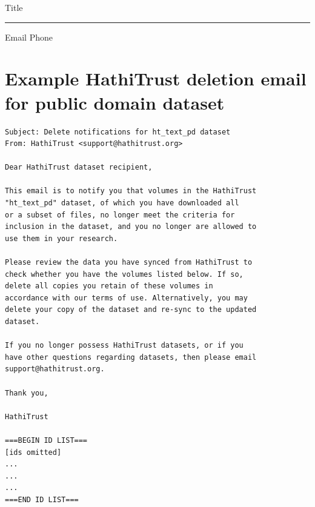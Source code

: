 \documentclass{anthology-ch}         %
\begin{document}
Title

\rule{\textwidth}{0.5pt}

Email \hspace{0.3\textwidth}  Phone


\section{Example HathiTrust deletion email for public domain dataset} \label{appdx:second}

\begin{verbatim}
Subject: Delete notifications for ht_text_pd dataset
From: HathiTrust <support@hathitrust.org>

Dear HathiTrust dataset recipient,

This email is to notify you that volumes in the HathiTrust
"ht_text_pd" dataset, of which you have downloaded all
or a subset of files, no longer meet the criteria for
inclusion in the dataset, and you no longer are allowed to
use them in your research.

Please review the data you have synced from HathiTrust to
check whether you have the volumes listed below. If so,
delete all copies you retain of these volumes in
accordance with our terms of use. Alternatively, you may
delete your copy of the dataset and re-sync to the updated
dataset.

If you no longer possess HathiTrust datasets, or if you
have other questions regarding datasets, then please email
support@hathitrust.org.

Thank you,

HathiTrust

===BEGIN ID LIST===
[ids omitted]
...
...
...
===END ID LIST===

\end{verbatim}
\end{document}
